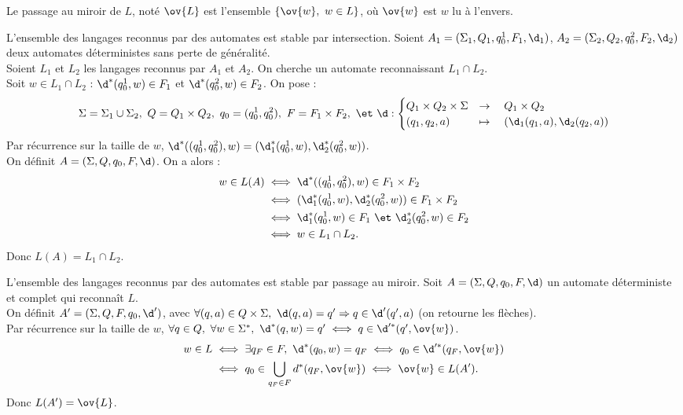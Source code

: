 \documentclass[french, 11pt]{article}
\renewcommand*{\S}{\Sigma}
\renewcommand*{\ra}{\Rightarrow}
\begin{document}
\begin{defi}{}{}
    Le passage au miroir de $L$, noté $\ov{L}$ est l'ensemble $\{\ov{w}, ~ w \in L\}$, où $\ov{w}$ est $w$ lu à l'envers.
\end{defi}

\vspace*{0.3cm}

\begin{prop}{}{}
    L'ensemble des langages reconnus par des automates est stable par intersection.
    \tcblower
    Soient $A_1=(\S_1,Q_1,q_0^1,F_1,\d_1)$, $A_2=(\S_2,Q_2,q_0^2,F_2,\d_2)$ deux automates déterministes sans perte de généralité.\\
    Soient $L_1$ et $L_2$ les langages reconnus par $A_1$ et $A_2$. On cherche un automate reconnaissant $L_1\cap L_2$.\\
    Soit $w\in L_1\cap L_2$ : $\d^*(q_0^1,w)\in F_1$ et $\d^*(q_0^2,w)\in F_2$. On pose :
    \begin{equation*}
        \S = \S_1 \cup \S_2, ~ Q = Q_1 \times Q_2, ~ q_0 = (q_0^1, q_0^2), ~ F=F_1\times F_2, ~ \et ~ \d: \begin{cases} Q_1 \times Q_2 \times \S &\to \quad Q_1 \times Q_2 \\ (q_1,q_2,a) &\mapsto \quad  (\d_1(q_1,a),\d_2(q_2,a)) \end{cases}
    \end{equation*}
    Par récurrence sur la taille de $w$, $\d^*((q_0^1, q_0^2), w) = (\d_1^*(q_0^1,w), \d_2^*(q_0^2,w))$.\\
    On définit $A=(\S, Q, q_0, F, \d)$. On a alors :
    \begin{align*}
        w \in L(A) &\iff \d^*((q_0^1,q_0^2),w) \in F_1\times F_2 \\
        &\iff (\d_1^*(q_0^1,w),\d_2^*(q_0^2,w))\in F_1\times F_2\\
        &\iff \d_1^*(q_0^1,w) \in F_1 ~\et~ \d_2^*(q_0^2,w) \in F_2\\
        &\iff w\in L_1 \cap L_2.
    \end{align*}
    Donc $L(A)=L_1\cap L_2$.
\end{prop}

\pagebreak

\begin{prop}{}{}
    L'ensemble des langages reconnus par des automates est stable par passage au miroir.
    \tcblower
    Soit $A=(\S,Q,q_0,F,\d)$ un automate déterministe et complet qui reconnaît $L$.\\
    On définit $A'=(\S,Q,F,q_0,\d')$, avec $\forall (q,a) \in Q\times \S, ~ \d(q,a)=q' \ra q \in \d'(q',a)$ (on retourne les flèches).\\
    Par récurrence sur la taille de $w$, $\forall q \in Q, ~ \forall w \in \S^*, ~ \d^*(q,w)=q' \iff q \in \d'^*(q',\ov{w})$.
    \begin{align*}
        w \in L &\iff \exists q_F \in F, ~ \d^*(q_0,w) = q_F  \iff q_0 \in \d'^*(q_F, \ov{w})\\
        &\iff q_0 \in \bigcup_{q_F \in F} d^*(q_F, \ov{w}) \iff \ov{w}\in L(A').
    \end{align*}
    Donc $L(A')=\ov{L}$.
\end{prop}
\end{document}

